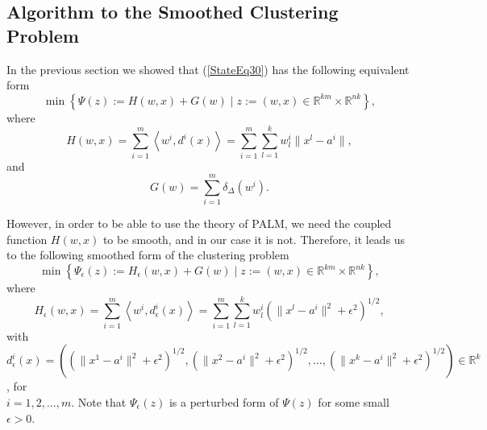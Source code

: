 \documentclass[11pt]{article}
\numberwithin{equation}{section}
\begin{document}
\subsection{Algorithm to the Smoothed Clustering Problem}

In the previous section we showed that (\ref{StateEq30}) has the following equivalent form
\begin{equation*}
	\min \left\lbrace \Psi(z) := H(w,x) + G(w) \mid z := (w,x) \in \mathbb{R}^{km} \times \mathbb{R}^{nk} \right\rbrace ,
\end{equation*}
where 
\begin{equation*}
	H(w,x) = \sum\limits_{i=1}^{m} \left\langle w^i , d^i(x) \right\rangle
	= \sum\limits_{i=1}^{m} \sum\limits_{l=1}^{k} w^i_l \| x^l - a^i \| ,
\end{equation*}
and 
\begin{equation*}
G(w) = \sum\limits_{i=1}^{m} \delta_{\Delta}(w^i) .
\end{equation*}

However, in order to be able to use the theory of PALM, we need the coupled function $H(w,x)$ to be smooth, and in our case it is not. Therefore, it leads us to the following smoothed form of the clustering problem
\begin{equation}
	\min \left\lbrace \Psi_{\epsilon}(z) := H_{\epsilon}(w,x) + G(w) \mid z := (w,x) \in \mathbb{R}^{km} \times \mathbb{R}^{nk} \right\rbrace , \label{StateEq31}
\end{equation}
where 
\begin{equation*}
	H_{\epsilon}(w,x) = \sum\limits_{i=1}^{m} \left\langle w^i , d_{\epsilon}^i(x) \right\rangle
	= \sum\limits_{i=1}^{m} \sum\limits_{l=1}^{k} w^i_l \left( \| x^l - a^i \|^2 + {\epsilon}^2 \right)^{1/2} ,
\end{equation*}
with $d_{\epsilon}^i(x) = \left( \left( \|x^1 - a^i\|^2 + {\epsilon}^2 \right)^{1/2}, \left( \|x^2 - a^i\|^2 + {\epsilon}^2 \right)^{1/2}, \ldots , \left( \|x^k - a^i\|^2 + {\epsilon}^2 \right)^{1/2} \right) \in \mathbb{R}^k$, for \\$i=1,2, \ldots , m$. Note that $\Psi_{\epsilon}(z)$ is a perturbed form of $\Psi(z)$ for some small $\epsilon > 0$.
\end{document}
